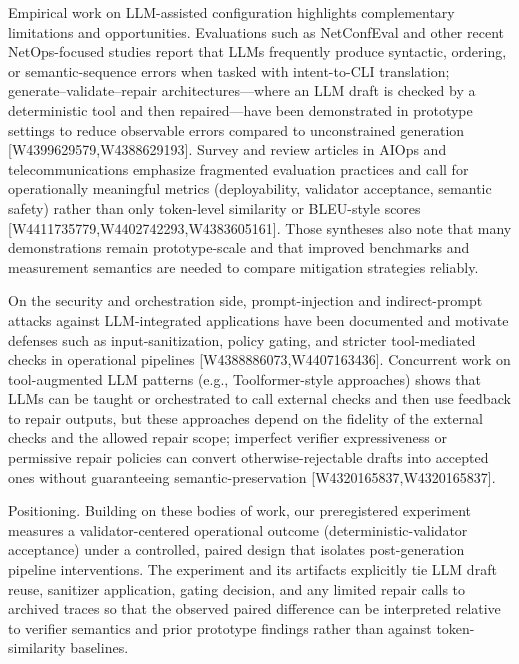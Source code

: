 \documentclass[conference]{IEEEtran}
\begin{document}
Empirical work on LLM-assisted configuration highlights complementary limitations and opportunities. Evaluations such as NetConfEval and other recent NetOps-focused studies report that LLMs frequently produce syntactic, ordering, or semantic-sequence errors when tasked with intent-to-CLI translation; generate--validate--repair architectures---where an LLM draft is checked by a deterministic tool and then repaired---have been demonstrated in prototype settings to reduce observable errors compared to unconstrained generation [W4399629579,W4388629193]. Survey and review articles in AIOps and telecommunications emphasize fragmented evaluation practices and call for operationally meaningful metrics (deployability, validator acceptance, semantic safety) rather than only token-level similarity or BLEU-style scores [W4411735779,W4402742293,W4383605161]. Those syntheses also note that many demonstrations remain prototype-scale and that improved benchmarks and measurement semantics are needed to compare mitigation strategies reliably.

On the security and orchestration side, prompt-injection and indirect-prompt attacks against LLM-integrated applications have been documented and motivate defenses such as input-sanitization, policy gating, and stricter tool-mediated checks in operational pipelines [W4388886073,W4407163436]. Concurrent work on tool-augmented LLM patterns (e.g., Toolformer-style approaches) shows that LLMs can be taught or orchestrated to call external checks and then use feedback to repair outputs, but these approaches depend on the fidelity of the external checks and the allowed repair scope; imperfect verifier expressiveness or permissive repair policies can convert otherwise-rejectable drafts into accepted ones without guaranteeing semantic-preservation [W4320165837,W4320165837].

Positioning. Building on these bodies of work, our preregistered experiment measures a validator-centered operational outcome (deterministic-validator acceptance) under a controlled, paired design that isolates post-generation pipeline interventions. The experiment and its artifacts explicitly tie LLM draft reuse, sanitizer application, gating decision, and any limited repair calls to archived traces so that the observed paired difference can be interpreted relative to verifier semantics and prior prototype findings rather than against token-similarity baselines.
\end{document}
